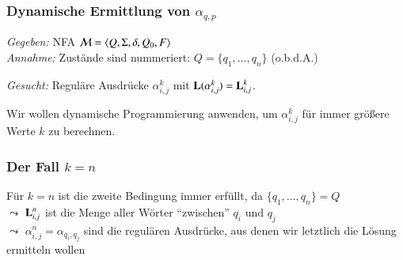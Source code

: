 \documentclass[onlymath]{beamer}
\begin{document}
\begin{frame}\frametitle{Dynamische Ermittlung von $\alpha_{q,p}$}

\emph{Gegeben:} NFA  $\mathcal{M}=\langle{Q,\Sigma,\delta,Q_0,F}\rangle$\\[1ex]
\emph{Annahme:} Zustände sind nummeriert: $Q=\{q_1,\ldots,q_n\}$ (o.b.d.A.)\\[1ex]


\emph{Gesucht:} Reguläre Ausdrücke $\alpha^k_{i,j}$ mit $\textbf{\textcolor{black}{L}}(\alpha^k_{i,j})=\textbf{\textcolor{black}{L}}_{i,j}^k$.
\medskip

\alert{Wir wollen dynamische Programmierung anwenden, um $\alpha^k_{i,j}$ für immer größere Werte $k$ zu berechnen.}

\end{frame}

\begin{frame}[t]\frametitle{Der Fall $k=n$}


Für $k=n$ ist die zweite Bedingung immer erfüllt, da $\{q_1,\ldots,q_n\}=Q$\\[1ex]
% 
$\leadsto$ $\textbf{\textcolor{black}{L}}_{i,j}^n$ ist die Menge aller Wörter "`zwischen"' $q_i$ und $q_j$\\[1ex]
%
$\leadsto$ $\alpha_{i,j}^n = \alpha_{q_i,q_j}$ sind die regulären Ausdrücke, aus denen wir letztlich die Lösung ermitteln wollen
\end{frame}
\end{document}
